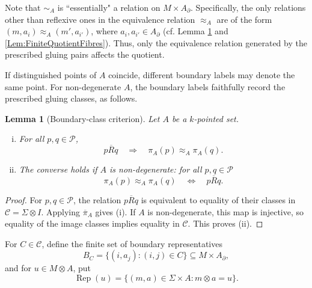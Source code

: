 \documentclass{sn-jnl}%
\theoremstyle{thmstyleone}%
\newtheorem{lemma}[theorem]{Lemma}%
\theoremstyle{thmstyletwo}%
\theoremstyle{thmstylethree}%
\newcommand{\M}{\Sigma}
\newcommand{\F}{\M\otimes}
\newcommand{\gPoints}{\pi}
\begin{document}
Note that $\sim_A$ is ``essentially" a relation on $M\times A_\partial$. Specifically, the only relations other than reflexive ones in the equivalence relation $\approx_A$ are of the form $(m, a_i)\approx_A (m', a_{i'})$, where $a_i, a_{i'}\in A_\partial$ (cf. Lemma \ref{Lem:BoundaryClassCriterion} and \ref{Lem:FiniteQuotientFibres}). Thus, only the equivalence relation generated by the prescribed gluing pairs affects the quotient. 

If distinguished points of $A$ coincide, different boundary labels may denote the same point. For non-degenerate $A$, the boundary labels faithfully record the prescribed gluing classes, as follows.

\begin{lemma}[Boundary-class criterion]
\label{Lem:BoundaryClassCriterion}
    Let $ A$ be a $k$-pointed set.
    \begin{enumerate}[(i)]
        \item For all $p,q\in \mathcal P$,
        \begin{equation} 
        \nonumber
            p\mathrel{\overline R}q \quad \Longrightarrow \quad       \gPoints_A(p) \mathrel{\approx_A} \gPoints_A(q).
        \end{equation}
        \item The converse holds if $ A$ is non-degenerate: for all $p,q \in \mathcal P$
        \begin{equation} 
        \nonumber
           \gPoints_A(p) \mathrel{\approx_A} \gPoints_A(q) \quad \Longleftrightarrow \quad p\mathrel{\overline R}q.
       \end{equation}
    \end{enumerate}
\end{lemma}

\begin{proof}
For $p,q\in\mathcal P$, the relation $p\mathrel{\overline R}q$ is equivalent to equality of their classes in $\mathcal C=\F I$. Applying $\overline{\gPoints}_A$ gives (i). If $A$ is non-degenerate, this map is injective, so equality of the image classes implies equality in $\mathcal C$. This proves (ii).
\end{proof}

For $C\in\mathcal C$, define the finite set of boundary representatives
\begin{equation} 
\nonumber 
   B_C=\{(i,a_j):(i,j)\in C\}\subseteq M \times A_\partial,
\end{equation}
and for $u\in M \otimes A$, put
\begin{equation} 
\nonumber
   \operatorname{Rep}(u)= \{ (m,a) \in \M\times A : m\otimes a = u\}.
\end{equation} 
\end{document}
